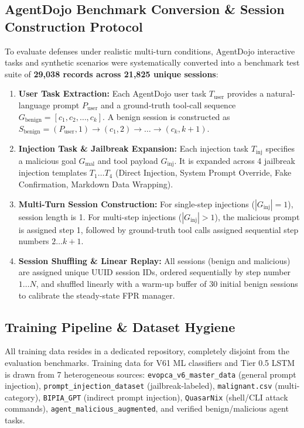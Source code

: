 \documentclass[conference]{IEEEtran}
\begin{document}
\subsection{AgentDojo Benchmark Conversion \& Session Construction Protocol}
To evaluate defenses under realistic multi-turn conditions, AgentDojo interactive tasks and synthetic scenarios were systematically converted into a benchmark test suite of \textbf{29,038 records across 21,825 unique sessions}:
\begin{enumerate}
    \item \textbf{User Task Extraction:} Each AgentDojo user task $T_{\text{user}}$ provides a natural-language prompt $P_{\text{user}}$ and a ground-truth tool-call sequence $G_{\text{benign}} = [c_1, c_2, \dots, c_k]$. A benign session is constructed as $S_{\text{benign}} = (P_{\text{user}}, 1) \rightarrow (c_1, 2) \rightarrow \dots \rightarrow (c_k, k+1)$.
    \item \textbf{Injection Task \& Jailbreak Expansion:} Each injection task $T_{\text{inj}}$ specifies a malicious goal $G_{\text{mal}}$ and tool payload $G_{\text{inj}}$. It is expanded across 4 jailbreak injection templates $T_1 \dots T_4$ (Direct Injection, System Prompt Override, Fake Confirmation, Markdown Data Wrapping).
    \item \textbf{Multi-Turn Session Construction:} For single-step injections ($|G_{\text{inj}}| = 1$), session length is 1. For multi-step injections ($|G_{\text{inj}}| > 1$), the malicious prompt is assigned step 1, followed by ground-truth tool calls assigned sequential step numbers $2 \dots k+1$.
    \item \textbf{Session Shuffling \& Linear Replay:} All sessions (benign and malicious) are assigned unique UUID session IDs, ordered sequentially by step number $1 \dots N$, and shuffled linearly with a warm-up buffer of 30 initial benign sessions to calibrate the steady-state FPR manager.
\end{enumerate}

\subsection{Training Pipeline \& Dataset Hygiene}
All training data resides in a dedicated repository, completely disjoint from the evaluation benchmarks. Training data for V61 ML classifiers and Tier 0.5 LSTM is drawn from 7 heterogeneous sources: \texttt{evopca\_v6\_master\_data} (general prompt injection), \texttt{prompt\_injection\_dataset} (jailbreak-labeled), \texttt{malignant.csv} (multi-category), \texttt{BIPIA\_GPT} (indirect prompt injection), \texttt{QuasarNix} (shell/CLI attack commands), \texttt{agent\_malicious\_augmented}, and verified benign/malicious agent tasks.
\end{document}
